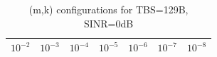 \begin{table}[ht]
\centering
\caption{(m,k) configurations for TBS=129B, SINR=0dB}
\label{tab:conf_{129B_0dB}}
\begin{tabular}{ccccccc}
\hline
$10^{-2}$ & $10^{-3}$ & $10^{-4}$ & $10^{-5}$ & $10^{-6}$ & $10^{-7}$ & $10^{-8}$ \\ \hline
\hline
\end{tabular}
\end{table}